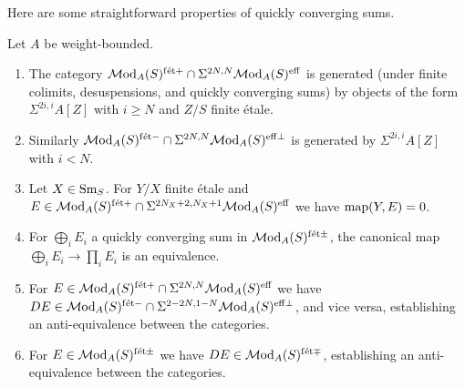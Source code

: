 \documentclass{amsart}
\numberwithin{proposition}{section}
\numberwithin{equation}{section}
\def\fet{\mathrm{f\acute et}}
\begin{document}
Here are some straightforward properties of quickly converging sums.
\begin{lemma} \label{lemm:quickly-converging-sum}
Let $A$ be weight-bounded.
\begin{enumerate}
\item The category $\Mod_A(S)^{\fet+} \cap \Sigma^{2N,N} \Mod_A(S)^{\eff}$ is generated (under finite colimits, desuspensions, and quickly converging sums) by objects of the form $\Sigma^{2i,i}A[Z]$ with $i \ge N$ and $Z/S$ finite étale.
\item Similarly $\Mod_A(S)^{\fet-} \cap \Sigma^{2N,N} \Mod_A(S)^{\eff\perp}$ is generated by $\Sigma^{2i,i}A[Z]$ with $i<N$.
\item Let $X \in {\mathrm{S}\mathrm{m}}_S$.
  For $Y/X$ finite étale and $E \in \Mod_A(S)^{\fet+} \cap \Sigma^{2N_X+2,N_X+1}\Mod_A(S)^{\eff}$ we have $\mathrm{map}(Y, E) = 0$.
\item For $\bigoplus_i E_i$ a quickly converging sum in $\Mod_A(S)^{\fet\pm}$, the canonical map $\bigoplus_i E_i \to \prod_i E_i$ is an equivalence.
\item For $E \in \Mod_A(S)^{\fet+} \cap \Sigma^{2N,N} \Mod_A(S)^{\eff}$ we have $DE \in \Mod_A(S)^{\fet-} \cap \Sigma^{2-2N,1-N} \Mod_A(S)^{\eff\perp}$, and vice versa, establishing an anti-equivalence between the categories.
\item For $E \in \Mod_A(S)^{\fet\pm}$ we have $DE \in \Mod_A(S)^{\fet\mp}$, establishing an anti-equivalence between the categories.
\end{enumerate}
\end{lemma}
\end{document}
